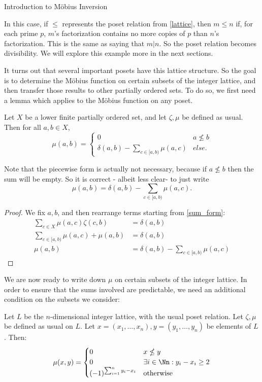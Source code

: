 \documentclass[12pt]{pom_thesis}
\begin{document}
\begin{chapter}{Introduction to M\"obius Inversion}
\begin{examp}
In this case, if $\leq$ represents the poset relation from \ref{lattice}, then $m \leq n$ if, for each prime $p$, $m$'s factorization contains no more copies of $p$ than $n$'s factorization. This is the same as saying that $m|n$. So the poset relation becomes divisibility. We will explore this example more in the next sections.
\end{examp}
It turns out that several important posets have this lattice structure. So the goal is to determine the M\"obius function on certain subsets of the integer lattice, and then transfer those results to other partially ordered sets. To do so, we first need a lemma which applies to the M\"obius function on any poset.
\begin{lemma}\label{recurse}
Let $X$ be a lower finite partially ordered set, and let $\zeta, \mu$ be defined as usual. Then for all $a, b \in X$,
\[
\mu(a,b) = 
\begin{cases}
0 & a \nleq b\\
\delta(a,b)-\sum_{c \in [a,b)}\mu(a,c) & else.
\end{cases}
\]
\end{lemma}
\begin{rmk}
Note that the piecewise form is actually not necessary, because if $a \nleq b$ then the sum will be empty. So it is correct - albeit less clear- to just write
\[
\mu(a,b) = \delta(a,b)-\sum_{c \in [a,b)}\mu(a,c).
\]
\end{rmk}
\begin{proof}
We fix $a,b$, and then rearrange terms starting from \ref{sum_form}:
\begin{align*}
\sum_{c \in X}\mu(a,c) \zeta(c,b) &= \delta(a,b)\\
\sum_{c \in [a,b)} \mu(a,c) + \mu(a,b) &= \delta(a,b)\\
\mu(a,b) &= \delta(a,b) - \sum_{c \in [a,b)} \mu(a,c) 
\end{align*}
\end{proof}
We are now ready to write down $\mu$ on certain subsets of the integer lattice. In order to ensure that the sums involved are predictable, we need an additional condition on the subsets we consider:

\begin{lemma}\label{int_lattice}
Let $L$ be the $n$-dimensional integer lattice, with the usual poset relation. Let $\zeta, \mu$ be defined as usual on $L$. Let $x=(x_1,\dots,x_n),y = (y_1,\dots,y_n)$ be elements of $L$. Then:
\[
\mu(x,y) =
\begin{cases}
0 & x\nleq y\\
0 & \exists i \in \Nn: y_i-x_i \geq 2\\
(-1)^{\sum_{i=1}^ny_i-x_i} & \text{otherwise}
\end{cases}
\]
\end{lemma}


\end{chapter}
\end{document}
